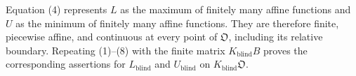 Equation (4) represents \(L\) as the maximum of finitely many affine functions and \(U\) as the minimum of finitely many affine functions.  They are therefore finite, piecewise affine, and continuous at every point of \(\mathfrak O\), including its relative boundary.  Repeating (1)--(8) with the finite matrix \(K_{\mathrm{blind}}B\) proves the corresponding assertions for \(L_{\mathrm{blind}}\) and \(U_{\mathrm{blind}}\) on \(K_{\mathrm{blind}}\mathfrak O\).